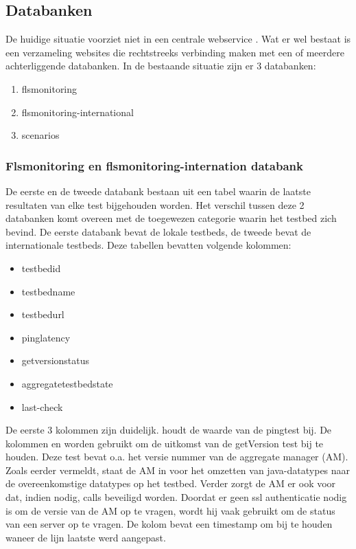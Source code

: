 \subsection{Databanken}
\npar
De huidige situatie voorziet niet in een centrale webservice \citep{FED4FIRE-doc}.
Wat er wel bestaat is een verzameling websites die rechtstreeks verbinding maken met een of meerdere achterliggende databanken. In de bestaande situatie zijn er 3 databanken:
\begin{enumerate}
\item flsmonitoring
\item flsmonitoring-international
\item scenarios
\end{enumerate}
\newpage
\subsubsection{Flsmonitoring en flsmonitoring-internation databank}
\npar
De eerste en de tweede databank bestaan uit een tabel waarin de laatste resultaten van elke test bijgehouden worden. Het verschil tussen deze 2 databanken komt overeen met de toegewezen categorie waarin het testbed zich bevind. De eerste databank bevat de lokale testbeds, de tweede bevat de internationale testbeds. Deze tabellen bevatten volgende kolommen:
\begin{itemize}
\item testbedid
\item testbedname
\item testbedurl
\item pinglatency
\item getversionstatus
\item aggregatetestbedstate
\item last-check
\end{itemize}
 De eerste 3 kolommen zijn duidelijk.  houdt de waarde van de pingtest bij.
De kolommen  en  worden gebruikt om de uitkomst van de getVersion test bij te houden. Deze test bevat o.a. het versie nummer van de aggregate manager (AM). Zoals eerder vermeldt, staat de AM in voor het omzetten van java-datatypes naar de overeenkomstige datatypes op het testbed. Verder zorgt de AM er ook voor dat, indien nodig, calls beveiligd worden. Doordat er geen ssl authenticatie nodig is om de versie van de AM op te vragen, wordt hij vaak gebruikt om de status van een server op te vragen. De kolom  bevat een timestamp om bij te houden waneer de lijn laatste werd aangepast.
